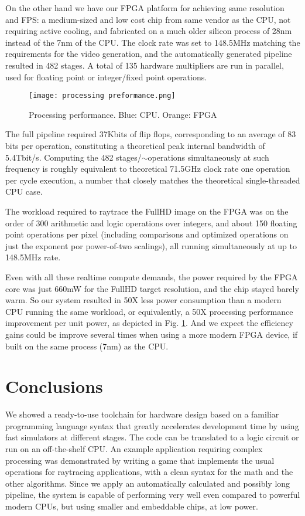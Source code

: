 \documentclass[conference]{IEEEtran}
\begin{document}
On the other hand we have our FPGA platform for achieving same resolution and FPS: a medium-sized and low cost chip from same vendor as the CPU, not requiring active cooling, and fabricated on a much older silicon process of 28nm instead of the 7nm of the CPU. The clock rate was set to 148.5MHz matching the requirements for the video generation, and the automatically generated pipeline resulted in 482 stages. A total of 135 hardware multipliers are run in parallel, used for floating point or integer/fixed point operations.

\begin{figure}
\texttt{[image: processing preformance.png]}
\caption{Processing performance. Blue: CPU. Orange: FPGA}
\label{figperf}
\end{figure}

The full pipeline required 37Kbits of flip flops, corresponding to an average of 83 bits per operation, constituting a theoretical peak internal bandwidth of 5.4Tbit/s. Computing the 482 stages/$\sim$operations simultaneously at such frequency is roughly equivalent to theoretical 71.5GHz clock rate one operation per cycle execution, a number that closely matches the theoretical single-threaded CPU case.

The workload required to raytrace the FullHD image on the FPGA was on the order of 300 arithmetic and logic operations over integers, and about 150 floating point operations per pixel (including comparisons and optimized operations on just the exponent por power-of-two scalings), all running simultaneously at up to 148.5MHz rate.

Even with all these realtime compute demands, the power required by the FPGA core was just 660mW for the FullHD target resolution, and the chip stayed barely warm. So our system resulted in 50X less power consumption than a modern CPU running the same workload, or equivalently, a 50X processing performance improvement per unit power, as depicted in Fig. \ref{figperf}. And we expect the efficiency gains could be improve several times when using a more modern FPGA device, if built on the same process (7nm) as the CPU.

\section{Conclusions}

We showed a ready-to-use toolchain for hardware design based on a familiar programming language syntax that greatly accelerates development time by using fast simulators at different stages. The code can be translated to a logic circuit or run on an off-the-shelf CPU. An example application requiring complex processing was demonstrated by writing a game that implements the usual operations for raytracing applications, with a clean syntax for the math and the other algorithms. Since we apply an automatically calculated and possibly long pipeline, the system is capable of performing very well even compared to powerful modern CPUs, but using smaller and embeddable chips, at low power.
\end{document}
